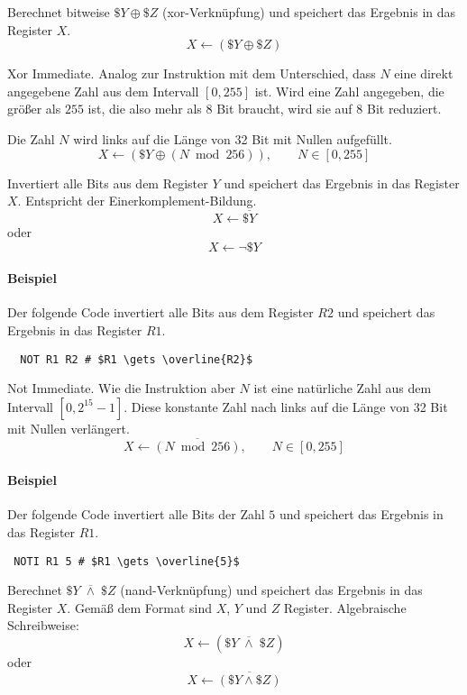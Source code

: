 Berechnet bitweise $\$Y \oplus \$Z$ (xor-Verknüpfung) und speichert das Ergebnis
in das Register $X$.
\[
    X \gets (\$Y \oplus \$Z)
\]


\glqq Xor Immediate\grqq.
Analog zur Instruktion  mit dem Unterschied, dass $N$ eine direkt
angegebene Zahl aus dem Intervall $[0, 255]$ ist. Wird eine Zahl angegeben, die
größer als $255$ ist, die also mehr als 8 Bit braucht, wird sie auf 8 Bit
reduziert. 

Die Zahl $N$ wird links auf die Länge von 32 Bit mit Nullen aufgefüllt.
\[
    X \gets (\$Y \oplus (N \bmod 256)), \qquad N \in [0, 255]
\]


Invertiert alle Bits aus dem Register $Y$ und speichert das Ergebnis in das
Register $X$. Entspricht der Einerkomplement-Bildung.
\[
    X \gets \overline{\$Y}
\]
oder
\[
    X \gets \lnot \$Y
\]

\paragraph{Beispiel} 
Der folgende Code invertiert alle Bits aus dem Register $R2$ und speichert das
Ergebnis in das Register $R1$.
\begin{lstlisting}
  NOT R1 R2 # $R1 \gets \overline{R2}$
\end{lstlisting}



\glqq Not Immediate\grqq.
Wie die Instruktion  aber $N$ ist eine natürliche Zahl aus dem
Intervall $[0, 2^{15}-1]$. Diese konstante Zahl nach links auf die Länge von 32
Bit mit Nullen verlängert.
\[
    X \gets \overline{(N \bmod 256)}, \qquad N \in [0, 255]
\]

\paragraph{Beispiel} 
Der folgende Code invertiert alle Bits der Zahl $5$ und speichert das Ergebnis
in das Register $R1$.
\begin{lstlisting}
 NOTI R1 5 # $R1 \gets \overline{5}$
\end{lstlisting}


Berechnet $\$Y \; \overline{\land} \; \$Z$ (nand-Verknüpfung) und speichert das
Ergebnis in das Register $X$. Gemäß dem Format  sind $X$, $Y$ und
$Z$ Register. Algebraische Schreibweise:
\[
    X \gets (\$Y \; \overline{\land} \; \$Z)
\]
oder
\[
    X \gets \overline{ (\$Y \land \$Z) }
\]


